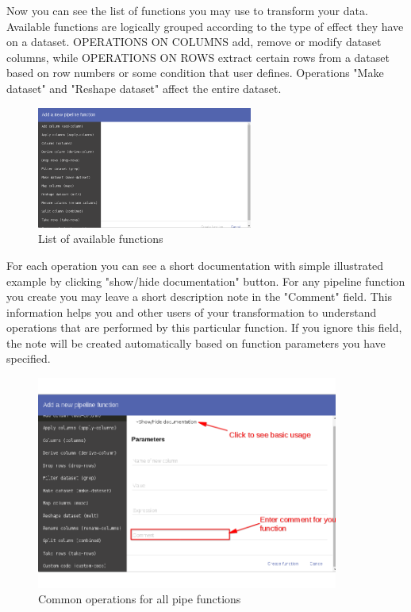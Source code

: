 \documentclass[USenglish]{article}
\begin{document}
Now you can see the list of functions you may use to transform your data. Available functions are logically grouped according to the type of effect they have on a dataset. OPERATIONS ON COLUMNS add, remove or modify dataset columns, while OPERATIONS ON ROWS extract certain rows from a dataset based on row numbers or some condition that user defines. Operations "Make dataset" and "Reshape dataset" affect the entire dataset.
\begin{center}
\begin{figure}[!htbp]
\centering
\includegraphics[height=4cm] {functionlist.png}
 \caption{List of available functions \label{meta}}
\end{figure}
\end{center}

 For each operation you can see a short documentation with simple illustrated example by clicking "show/hide documentation" button. For any pipeline function you create you may leave a short description note in the "Comment" field. This information helps you and other users of your transformation to understand operations that are performed by this particular function. If you ignore this field, the note will be created automatically based on function parameters you have specified.
 
 \begin{center}
\begin{figure}[!htbp]
\centering
\includegraphics[height=7cm] {pipefunccommon.png}
 \caption{Common operations for all pipe functions \label{meta}}
\end{figure}
\end{center}
\end{document}
